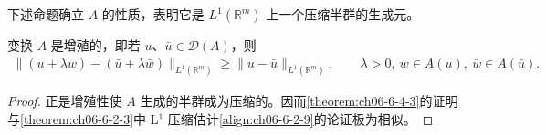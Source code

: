 \documentclass[../../main.tex]{subfiles}
\begin{document}
下述命题确立 $A$ 的性质，表明它是 $L^{1}(\mathbb{R}^{m})$ 上一个压缩半群的生成元。

\begin{theorem}\label{theorem:ch06-6-4-3}
变换 $A$ 是增殖的，即若 $u$、$\bar{u}\in\mathscr{D}(A)$，则
\begin{align}
\|(u+\lambda w)-(\bar{u}+\lambda\bar{w})\|_{L^{1}(\mathbb{R}^{m})}\geqslant\|u-\bar{u}\|_{L^{1}(\mathbb{R}^{m})},\qquad \lambda>0,\ w\in A(u),\ \bar{w}\in A(\bar{u}).
\label{align:ch06-6-4-9}
\end{align}
\end{theorem}

\begin{proof}
正是增殖性使 $A$ 生成的半群成为压缩的。因而\cref{theorem:ch06-6-4-3}的证明与\cref{theorem:ch06-6-2-3}中 L$^{1}$ 压缩估计\eqref{align:ch06-6-2-9}的论证极为相似。


\end{proof}
\end{document}
